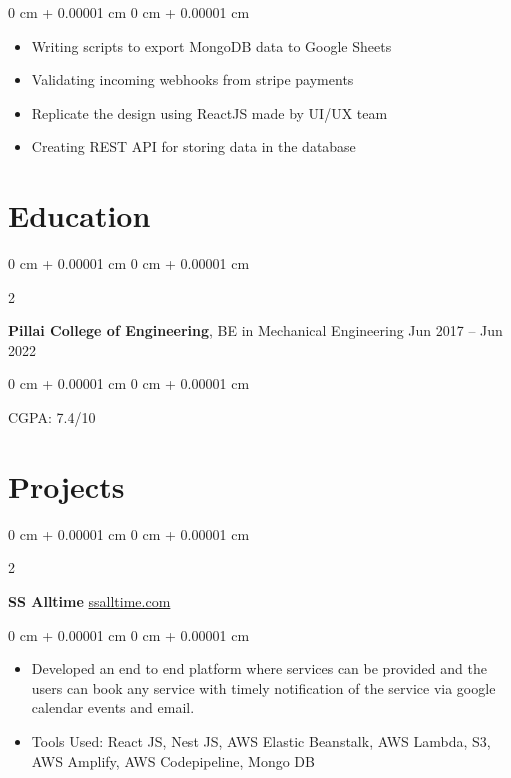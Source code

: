 \documentclass[10pt, letterpaper]{article}
\newenvironment{highlights}{
    \begin{itemize}[
        topsep=0.10 cm,
        parsep=0.10 cm,
        partopsep=0pt,
        itemsep=0pt,
        leftmargin=0 cm + 10pt
    ]
}{
    \end{itemize}
} %
\newenvironment{onecolentry}{
    \begin{adjustwidth}{
        0 cm + 0.00001 cm
    }{
        0 cm + 0.00001 cm
    }
}{
    \end{adjustwidth}
} %
\newenvironment{twocolentry}[2][]{
    \onecolentry
    \def\secondColumn{#2}
    \setcolumnwidth{\fill, 4.5 cm}
    \begin{paracol}{2}
}{
    \switchcolumn \raggedleft \secondColumn
    \end{paracol}
    \endonecolentry
} %
\begin{document}
        \vspace{0.10 cm}
        \begin{onecolentry}
            \begin{highlights}
                \item Writing scripts to export MongoDB data to Google Sheets
                \item Validating incoming webhooks from stripe payments
                \item Replicate the design using ReactJS made by UI/UX team 
                \item Creating REST API for storing data in the database
            \end{highlights}
        \end{onecolentry}


        \vspace{0.2 cm}

    \section{Education}



        
        \begin{twocolentry}{
            Jun 2017 – Jun 2022
        }
            \textbf{Pillai College of Engineering}, BE in Mechanical Engineering\end{twocolentry}

        \vspace{0.10 cm}
        \begin{onecolentry}

            CGPA: 7.4/10

        \end{onecolentry}
        \vspace{0.20 cm}




    

    \section{Projects}



        
        \begin{twocolentry}{
            \href{https://ssalltime.com}{ssalltime.com}
        }
            \textbf{SS Alltime}\end{twocolentry}

        \vspace{0.10 cm}
        \begin{onecolentry}
            \begin{highlights}
                \item Developed an end to end platform where services can be provided and the users can book any service with timely notification of the service via google calendar events and email.
                \item Tools Used: React JS, Nest JS, AWS Elastic Beanstalk, AWS Lambda, S3, AWS Amplify, AWS Codepipeline, Mongo DB
            \end{highlights}
        \end{onecolentry}
\end{document}
